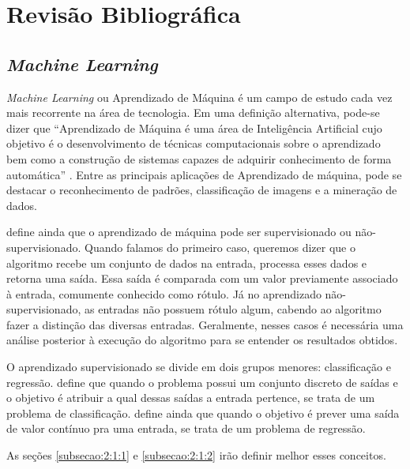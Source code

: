 \chapter{Revisão Bibliográfica}
\label{cap:2}
\vspace{-1.9cm}


\section{\textit{Machine Learning}}
\label{secao:2:1}
\vspace{-.6cm}

\textit{Machine Learning} ou Aprendizado de Máquina é um campo de estudo cada vez mais recorrente na área de tecnologia. Em uma definição alternativa, pode-se dizer que ``Aprendizado de Máquina é uma área de Inteligência Artificial cujo objetivo é o desenvolvimento de técnicas computacionais sobre o aprendizado bem como a construção de sistemas capazes de adquirir conhecimento de forma automática'' \cite{monard-2003}. Entre as principais aplicações de Aprendizado de máquina, pode se destacar o reconhecimento de padrões, classificação de imagens e a mineração de dados. 

 define ainda que o aprendizado de máquina pode ser supervisionado ou não-supervisionado. Quando falamos do primeiro caso, queremos dizer que o algoritmo recebe um conjunto de dados na entrada, processa esses dados e retorna uma saída. Essa saída é comparada com um valor previamente associado à entrada, comumente conhecido como rótulo. Já no aprendizado não-supervisionado, as entradas não possuem rótulo algum, cabendo ao algoritmo fazer a distinção das diversas entradas. Geralmente, nesses casos é necessária uma análise posterior à execução do algoritmo para se entender os resultados obtidos.

O aprendizado supervisionado se divide em dois grupos menores: classificação e regressão.  define que quando o problema possui um conjunto discreto de saídas e o objetivo é atribuir a qual dessas saídas a entrada pertence, se trata de um problema de classificação.  define ainda que quando o objetivo é prever uma saída de valor contínuo pra uma entrada, se trata de um problema de regressão.

As seções \ref{subsecao:2:1:1} e \ref{subsecao:2:1:2} irão definir melhor esses conceitos.


